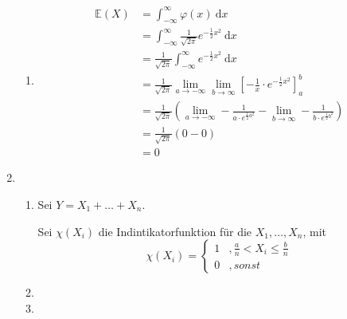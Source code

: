 \documentclass[a4paper]{scrartcl}
\newcommand{\dif}{\ \mathrm{d}}
\def \blattnr {5}
\begin{document}
\begin{enumerate}[label=\bfseries \blattnr.\arabic*]
\begin{enumerate}
	  \item
	    \begin{equation*}
	     \begin{split}
		\mathbb{E}(X)
		&= \int_{-\infty}^{\infty} \varphi(x) \dif x \\
		&= \int_{-\infty}^{\infty} \frac1{\sqrt{2\pi}} e^{-\frac12x^2} \dif x \\
		&= \frac1{\sqrt{2\pi}} \int_{-\infty}^{\infty} e^{-\frac12x^2} \dif x \\
		&= \frac1{\sqrt{2\pi}} \lim_{a\to -\infty} \lim_{b\to\infty} \left[ - \frac1x \cdot e^{-\frac12 x^2} \right]_a^b \\
		&= \frac1{\sqrt{2\pi}} \left( \lim_{a\to -\infty} - \frac1  {a \cdot e^{\frac12 a^2}} - \lim_{b\to\infty} - \frac1 {b \cdot e^{\frac12 b^2}} \right) \\
		&= \frac1{\sqrt{2\pi}} (0 - 0) \\
		&= 0
	     \end{split}
	    \end{equation*}


        \end{enumerate}
   
    \item
        \begin{enumerate}
            \item
	      Sei $Y = X_1 + \ldots + X_n$.
	      
	      Sei $\chi(X_i)$ die Indintikatorfunktion für die $X_1, \ldots, X_n$, mit
	      \begin{equation*}
	      \chi(X_i) = \begin{cases}
			    1 &, \frac{a}n < X_i \leq \frac{b}n \\
			    0 &, sonst
	                  \end{cases}
	      \end{equation*}

	      
	    \item

            \item

        \end{enumerate}
   
\end{enumerate}
\end{document}
